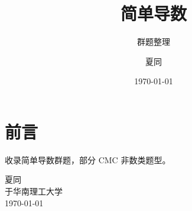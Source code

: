 \documentclass[lang=cn,11pt,thmcnt=section]{elegantbook}
\title{简单导数}
\subtitle{群题整理}
\author{夏同}
\institute{华南理工大学}
\date{\today}
\renewcommand{\makeenvindex}{%
  \listofdefinitions
  \listoftheorems
  \listofexamples
  \listofexercises
  \listofproperties
}
\begin{document}
\maketitle
\frontmatter

\chapter*{前言}

收录简单导数群题，部分 CMC 非数类题型。

\vspace{0.5cm}
\begin{flushright}
夏同\\
于华南理工大学\\
\today
\end{flushright}

\tableofcontents
\makeenvindex

\mainmatter












\end{document}

